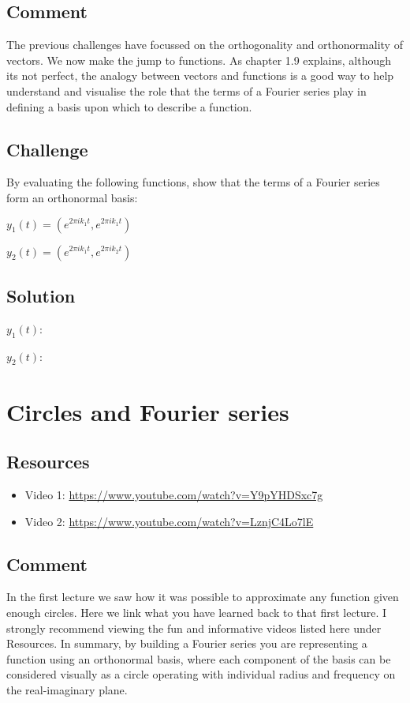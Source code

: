 \subsection*{Comment}
The previous challenges have focussed on the orthogonality and orthonormality of vectors. We now make the jump to functions. As chapter 1.9 explains, although its not perfect, the analogy between vectors and functions is a good way to help understand and visualise the role that the terms of a Fourier series play in defining a basis upon which to describe a function.

\subsection*{Challenge}
By evaluating the following functions, show that the terms of a Fourier series form an orthonormal basis:

$y_1(t) = (e^{2 \pi i k_1 t}, e^{2 \pi i k_1 t})$

$y_2(t) = (e^{2 \pi i k_1 t}, e^{2 \pi i k_2 t})$

\subsection*{Solution}
$y_1(t)$:\\

$y_2(t)$:\\




\newpage
\section{Circles and Fourier series}

\subsection*{Resources}
\begin{itemize}
    \item Video 1: \url{https://www.youtube.com/watch?v=Y9pYHDSxc7g}
    \item Video 2: \url{https://www.youtube.com/watch?v=LznjC4Lo7lE}
\end{itemize}

\subsection*{Comment}
In the first lecture we saw how it was possible to approximate any function given enough circles. Here we link what you have learned back to that first lecture. I strongly recommend viewing the fun and informative videos listed here under Resources. In summary, by building a Fourier series you are representing a function using an orthonormal basis, where each component of the basis can be considered visually as a circle operating with individual radius and frequency on the real-imaginary plane.

